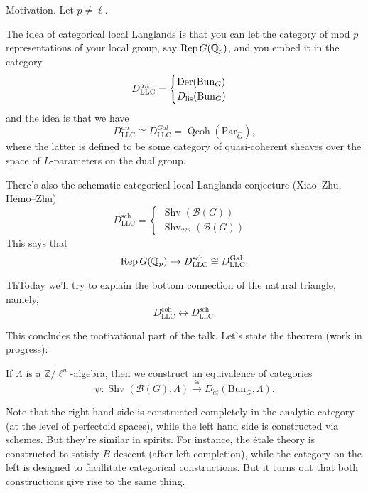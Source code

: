 \documentclass[reqno]{amsart} 
\begin{document}
Motivation.  Let $p \neq \ell$.

The idea of categorical local Langlands is that you can let the category of mod $p$ representations of your local group, say $\operatorname{Rep} G(\mathbb{Q}_p)$, and you embed it in the category
\begin{equation*}
  D_{\mathrm{LLC}}^{an} =
  \begin{cases}
    \operatorname{Der}(\mathrm{Bun} _G)    & \\
    D_{\mathrm{lis}}(\mathrm{Bun}_G)                     & 
  \end{cases}
\end{equation*}
and the idea is that we have
\begin{equation*}
  D_{\mathrm{LLC}}^{an} \cong D_{\mathrm{LLC}}^{Gal} = \operatorname{Qcoh}(\mathrm{Par}_{\hat{G}}),
\end{equation*}
where the latter is defined to be some category of quasi-coherent sheaves over the space of $L$-parameters on the dual group.

There's also the schematic categorical local Langlands conjecture (Xiao--Zhu, Hemo--Zhu)
\begin{equation*}
  D_{\mathrm{LLC}}^{\mathrm{sch}}
  =
  \begin{cases}
    \operatorname{Shv}(\mathcal{B}(G))    &  \\
    \operatorname{Shv}_{???}(\mathcal{B}(G))                                          & 
  \end{cases}  
\end{equation*}
This says that
\begin{equation*}
  \operatorname{Rep} G(\mathbb{Q}_p) \hookrightarrow D_{\mathrm{LLC}}^{\mathrm{sch}}
  \cong D_{\mathrm{LLC}}^{\mathrm{Gal}}.  
\end{equation*}

ThToday we'll try to explain the bottom connection of the natural triangle, namely,
\begin{equation*}
  D_{\mathrm{LLC}}^{\mathrm{coh}} \leftrightarrow D_{\mathrm{LLC}}^{\mathrm{sch}}.
\end{equation*}

This concludes the motivational part of the talk.  Let's state the theorem (work in progress):
\begin{theorem}[In progress]
  If $\Lambda$ is a $\mathbb{Z} / \ell^n$-algebra, then we construct an equivalence of categories
  \begin{equation*}
    \psi : \operatorname{Shv}(\mathcal{B}(G) , \Lambda) \xrightarrow{\cong}
    D_{\acute{e}t}(\mathrm{Bun}_G, \Lambda).
  \end{equation*}  
\end{theorem}
Note that the right hand side is constructed completely in the analytic category (at the level of perfectoid spaces), while the left hand side is constructed via schemes.  But they're similar in spirits.  For instance, the {\'e}tale theory is constructed to satisfy $B$-descent (after left completion), while the category on the left is designed to facillitate categorical constructions.  But it turns out that both constructions give rise to the same thing.
\end{document}
